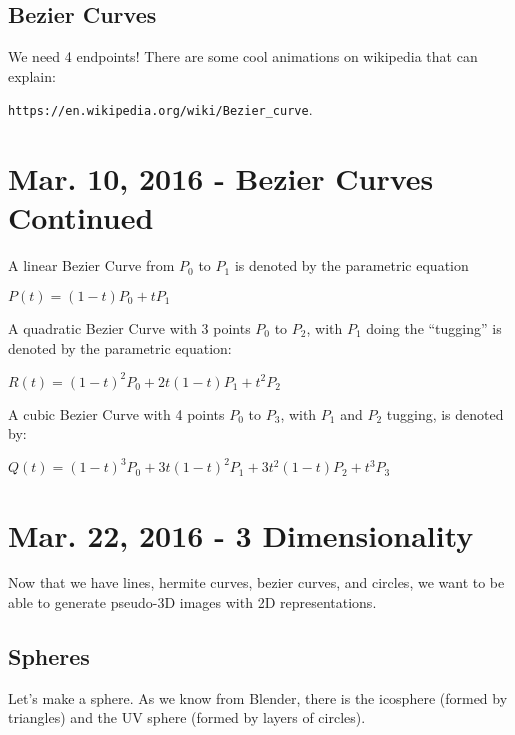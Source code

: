 \documentclass[11pt,fleqn]{article}
\theoremstyle{definition}
\begin{document}
\subsection{Bezier Curves}

We need 4 endpoints! There are some cool animations on wikipedia that can explain: \\

\begin{center}
    \texttt{https://en.wikipedia.org/wiki/Bezier\_curve}.
\end{center}

\section{Mar. 10, 2016 - Bezier Curves Continued}

A linear Bezier Curve from $P_0$ to $P_1$ is denoted by the parametric equation
\begin{center}
    $P(t) = (1-t)P_0 + tP_1$
\end{center}

A quadratic Bezier Curve with 3 points $P_0$ to $P_2$, with $P_1$ doing the
``tugging'' is denoted by the parametric equation:
\begin{center}
    $R(t) = (1 - t)^2 P_0 + 2t(1 - t)P_1 + t^2 P_2$
\end{center}

A cubic Bezier Curve with 4 points $P_0$ to $P_3$, with $P_1$ and $P_2$ tugging, is
denoted by:
\begin{center}
    $Q(t) = (1 - t)^3 P_0 + 3t(1 - t)^2 P_1 + 3t^2(1 - t) P_2 + t^3 P_3$
\end{center}

\newpage

\section{Mar. 22, 2016 - 3 Dimensionality}

Now that we have lines, hermite curves, bezier curves, and circles, we want to be
able to generate pseudo-3D images with 2D representations.

\subsection{Spheres}

Let's make a sphere. As we know from Blender, there is the icosphere (formed by
triangles) and the UV sphere (formed by layers of circles).
\end{document}
